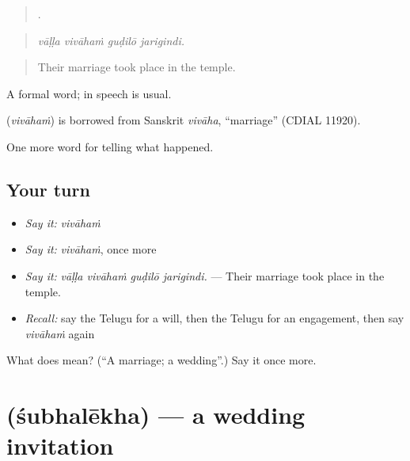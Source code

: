\begin{quote}
   .
\end{quote}

\begin{quote}
\emph{vāḷḷa vivāhaṁ guḍilō jarigindi.}
\end{quote}

\begin{quote}
Their marriage took place in the temple.
\end{quote}

A formal word; in speech  is usual.

\begin{cousinweb}
\textbf{} (\emph{vivāhaṁ}) is borrowed from Sanskrit \emph{vivāha}, \textquotedblleft{}marriage\textquotedblright{} (CDIAL 11920).
\end{cousinweb}

\begin{grammarlens}[title={What you've built}]
One more word for telling what happened.
\end{grammarlens}

\subsection*{Your turn}
\begin{itemize}
\raggedright
  \item \emph{Say it:} \emph{vivāhaṁ}
  \item \emph{Say it:} \emph{vivāhaṁ}, once more
  \item \emph{Say it:} \emph{vāḷḷa vivāhaṁ guḍilō jarigindi.} — Their marriage took place in the temple.
  \item \emph{Recall:} say the Telugu for a will, then the Telugu for an engagement, then say \emph{vivāhaṁ} again
\end{itemize}

\begin{tcolorbox}[breakable,colback=teal!4,colframe=teal!35!black,title={Before you move on}]
What does  mean? (\textquotedblleft{}A marriage; a wedding\textquotedblright{}.) Say it once more.
\end{tcolorbox}
\section[\texorpdfstring{\te{శుభలేఖ} (śubhalēkha)}{శుభలేఖ (śubhalēkha)}]{ (śubhalēkha) — a wedding invitation}

